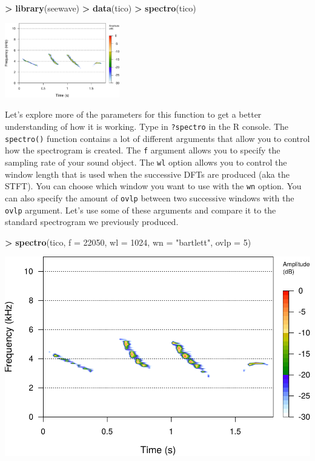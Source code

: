 \documentclass[]{krantz}
\makeatletter
\newenvironment{Shaded}{\begin{snugshade}}{\end{snugshade}}
\newcommand{\DataTypeTok}[1]{\textcolor[rgb]{0.27,0.27,0.27}{#1}}
\newcommand{\DecValTok}[1]{\textcolor[rgb]{0.06,0.06,0.06}{#1}}
\newcommand{\KeywordTok}[1]{\textcolor[rgb]{0.27,0.27,0.27}{\textbf{#1}}}
\newcommand{\NormalTok}[1]{#1}
\newcommand{\OperatorTok}[1]{\textcolor[rgb]{0.43,0.43,0.43}{\textbf{#1}}}
\newcommand{\StringTok}[1]{\textcolor[rgb]{0.5,0.5,0.5}{#1}}
\newenvironment{kframe}{%
\medskip{}
\setlength{\fboxsep}{.8em}
 \def\at@end@of@kframe{}%
 \ifinner\ifhmode%
  \def\at@end@of@kframe{\end{minipage}}%
  \begin{minipage}{\columnwidth}%
 \fi\fi%
 \def\FrameCommand##1{\hskip\@totalleftmargin \hskip-\fboxsep
 \colorbox{shadecolor}{##1}\hskip-\fboxsep
     \hskip-\linewidth \hskip-\@totalleftmargin \hskip\columnwidth}%
 \MakeFramed {\advance\hsize-\width
   \@totalleftmargin\z@ \linewidth\hsize
   \@setminipage}}%
 {\par\unskip\endMakeFramed%
 \at@end@of@kframe}
\renewenvironment{Shaded}{\begin{kframe}}{\end{kframe}}
\makeatother
\begin{document}
\begin{Shaded}
\begin{Highlighting}[]
\OperatorTok{>}\StringTok{ }\KeywordTok{library}\NormalTok{(seewave)}
\OperatorTok{>}\StringTok{ }\KeywordTok{data}\NormalTok{(tico)}
\OperatorTok{>}\StringTok{ }\KeywordTok{spectro}\NormalTok{(tico)}
\end{Highlighting}
\end{Shaded}

\includegraphics[width=5cm]{bookdown_files/figure-latex/unnamed-chunk-314-1}

Let's explore more of the parameters for this function to get a better understanding of how it is working. Type in \texttt{?spectro} in the R console. The \texttt{spectro()} function contains a lot of different arguments that allow you to control how the spectrogram is created. The \texttt{f} argument allows you to specify the sampling rate of your sound object. The \texttt{wl} option allows you to control the window length that is used when the successive DFTs are produced (aka the STFT). You can choose which window you want to use with the \texttt{wn} option. You can also specify the amount of \texttt{ovlp} between two successive windows with the \texttt{ovlp} argument. Let's use some of these arguments and compare it to the standard spectrogram we previously produced.

\begin{Shaded}
\begin{Highlighting}[]
\OperatorTok{>}\StringTok{ }\KeywordTok{spectro}\NormalTok{(tico, }\DataTypeTok{f =} \DecValTok{22050}\NormalTok{, }\DataTypeTok{wl =} \DecValTok{1024}\NormalTok{, }\DataTypeTok{wn =} \StringTok{"bartlett"}\NormalTok{, }\DataTypeTok{ovlp =} \DecValTok{5}\NormalTok{)}
\end{Highlighting}
\end{Shaded}

\includegraphics{bookdown_files/figure-latex/unnamed-chunk-315-1.pdf}
\end{document}

